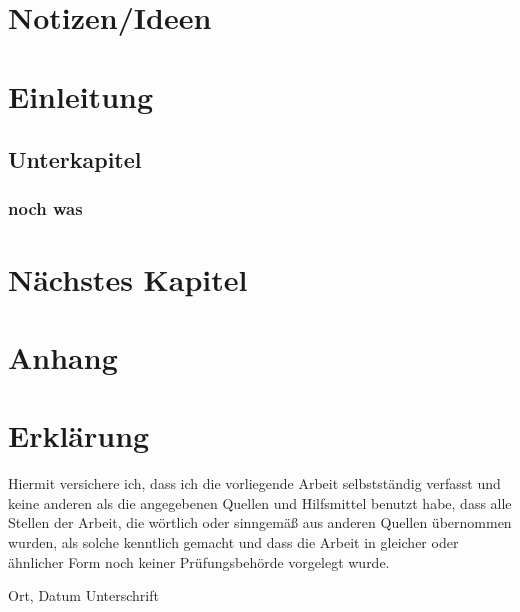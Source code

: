\chapter*{Notizen/Ideen}


\chapter{Einleitung} \label{c.einleitung}

\section{Unterkapitel} \label{s.unterkapitel}

\subsection{noch was} \label{ss.nochwas}

\chapter{Nächstes Kapitel} \label{c.naechstes}

\newpage

\appendix
\chapter{Anhang}







\chapter*{Erklärung}

Hiermit versichere ich, dass ich die vorliegende Arbeit selbstständig verfasst und keine anderen als die angegebenen Quellen und Hilfsmittel benutzt habe, dass alle Stellen der Arbeit, die wörtlich oder sinngemäß aus anderen Quellen übernommen wurden, als solche kenntlich gemacht und dass die Arbeit in gleicher oder ähnlicher Form noch keiner Prüfungsbehörde vorgelegt wurde.

\vspace{3cm}
Ort, Datum \hspace{5cm} Unterschrift\\

